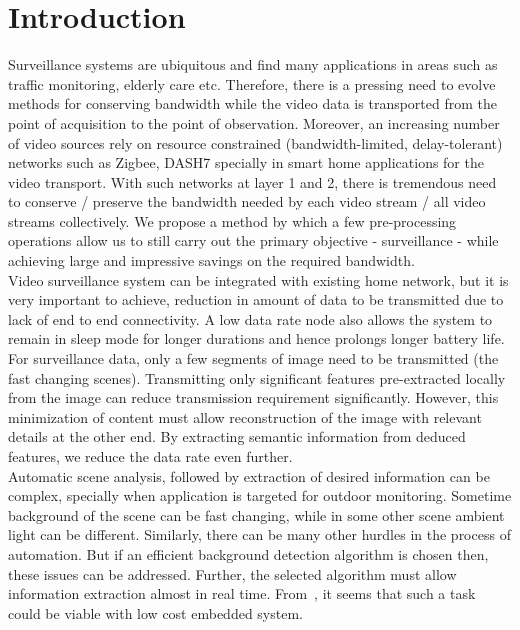 \documentclass[conference]{IEEEtran}
\begin{document}
\section{Introduction}
\indent Surveillance systems are ubiquitous and find many applications
in areas such as traffic monitoring, elderly care etc. Therefore, there
is a pressing need to evolve methods for conserving bandwidth while the
video data is transported from the point of acquisition to the point of
observation. Moreover, an increasing number of video sources rely on
resource constrained (bandwidth-limited, delay-tolerant) networks
such as Zigbee, DASH7 specially in smart home applications for the video
transport. With such networks at layer 1 and 2, there is tremendous
need to conserve / preserve the bandwidth needed by each video stream /
all video streams collectively. We propose a method by which a few
pre-processing operations allow us to still carry out the primary
objective - surveillance - while achieving large and impressive savings
on the required bandwidth.\\
\indent Video surveillance system can be integrated with existing home
network, but it is very important to achieve, reduction in amount
of data to be transmitted due to lack of end to end connectivity. A low
data rate node also allows the system to remain in sleep mode for
longer durations and hence prolongs longer battery life.\\
\indent For surveillance data, only a few segments of image need to be
transmitted (the fast changing scenes). Transmitting only significant
features pre-extracted locally from the image can reduce transmission
requirement significantly. However, this minimization of content must
allow reconstruction of the image with relevant details at the other
end. By extracting semantic information from deduced features, we
reduce the data rate even further.\\
\indent Automatic scene analysis, followed by extraction of  desired
information can be complex, specially when application is targeted for
outdoor monitoring. Sometime background of the scene can be fast
changing, while in some other scene ambient light can be different.
Similarly, there can be many other hurdles in the process of automation.
But if an efficient background detection algorithm is chosen then, these
issues can be addressed. Further, the selected algorithm must allow
information extraction almost in real time. From~\cite{3, 5},
it seems that such a task could be
viable with low cost embedded system.\\
\end{document}
